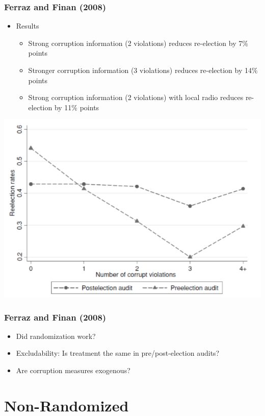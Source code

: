 \documentclass[xcolor=x11names,compress]{beamer}\usepackage[]{graphicx}\usepackage[]{color}
\renewcommand{\(}{\begin{columns}}
\renewcommand{\)}{\end{columns}}
\newcommand{\<}[1]{\begin{column}{#1}}
\renewcommand{\>}{\end{column}}
\begin{document}
\begin{frame}
\frametitle{Ferraz and Finan (2008)}
\begin{itemize}
\item Results
\begin{itemize}
\item Strong corruption information (2 violations) reduces re-election by 7\% points
\item Stronger corruption information (3 violations) reduces re-election by 14\% points
\item Strong corruption information (2 violations) with local radio reduces re-election by 11\% points
\end{itemize}
\end{itemize}
\end{frame}

\begin{frame}
\begin{center}
\includegraphics[scale=0.45]{Chart_FF.png}
\end{center}
\end{frame}

\begin{frame}
\frametitle{Ferraz and Finan (2008)}
\begin{itemize}
\item Did randomization work?
\item Excludability: Is treatment the same in pre/post-election audits?
\item Are corruption measures exogenous?
\end{itemize}
\end{frame}

\section{Non-Randomized}
\end{document}
